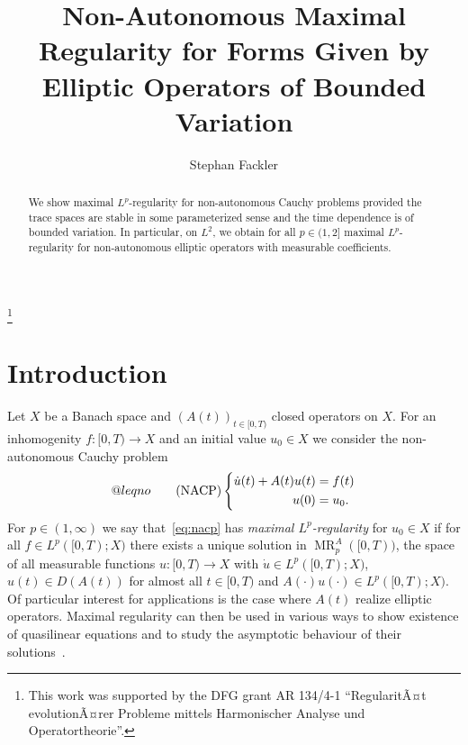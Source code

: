 \documentclass[reqno,a4paper,final]{amsart}
\numberwithin{equation}{section}
\theoremstyle{definition}
\begin{document}
\title[Maximal Regularity for Elliptic Operators of Bounded Variation]{Non-Autonomous Maximal Regularity for Forms Given by Elliptic Operators of Bounded Variation}

\begin{abstract}
	We show maximal $L^p$-regularity for non-autonomous Cauchy problems provided the trace spaces are stable in some parameterized sense and the time dependence is of bounded variation. In particular, on $L^2$, we obtain for all $p \in (1,2]$ maximal $L^p$-regularity for non-autonomous elliptic operators with measurable coefficients.    
\end{abstract}

\author{Stephan Fackler}
\address{Institute of Applied Analysis, Ulm University, Helmholtzstr.\ 18, 89069 Ulm}
\thanks{This work was supported by the DFG grant AR 134/4-1 ``RegularitÃ¤t evolutionÃ¤rer Probleme mittels Harmonischer Analyse und Operatortheorie''.}
\keywords{}

\maketitle

\section{Introduction}
	
	Let $X$ be a Banach space and $(A(t))_{t \in [0,T)}$ closed operators on $X$. For an inhomogenity $f\colon [0,T) \to X$ and an initial value $u_0 \in X$ we consider the non-autonomous Cauchy problem
	\begin{equation*}
		{\let\veqno\@@leqno}
		\label{eq:nacp}\tag{NACP}
		\left\{
		\begin{aligned}
			\dot{u}(t) + A(t)u(t) & = f(t) \\
			u(0) & = u_0.
		\end{aligned}
		\right.
	\end{equation*}
	For $p \in (1, \infty)$ we say that~\eqref{eq:nacp} has \emph{maximal $L^p$-regularity} for $u_0 \in X$ if for all $f \in L^p([0,T);X)$ there exists a unique solution in $\operatorname{MR}_{p}^{A}([0,T))$, the space of all measurable functions $u\colon [0,T) \to X$ with $\dot{u} \in L^p([0,T);X)$, $u(t) \in D(A(t))$ for almost all $t \in [0,T)$ and $A(\cdot)u(\cdot) \in L^p([0,T);X)$. Of particular interest for applications is the case where $A(t)$ realize elliptic operators. Maximal regularity can then be used in various ways to show existence of quasilinear equations and to study the asymptotic behaviour of their solutions~\cite{Pru02}.
	
\end{document}
